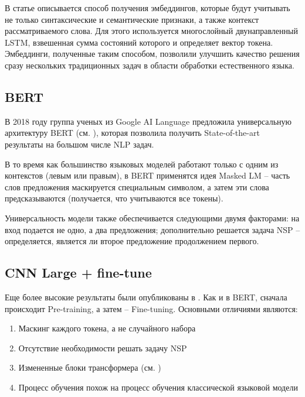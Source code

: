 \documentclass[a4paper,14pt]{extarticle}
\begin{document}
В статье \cite{1802.05365} описывается способ получения эмбеддингов, которые будут учитывать не только синтаксические и семантические признаки, а также контекст рассматриваемого слова. Для этого используется многослойный двунаправленный LSTM, взвешенная сумма состояний которого и определяет вектор токена. Эмбеддинги, полученные таким способом, позволили улучшить качество решения сразу нескольких традиционных задач в области обработки естественного языка.


\subsection{BERT}

В 2018 году группа ученых из Google AI Language предложила универсальную архитектуру BERT (см. \cite{1810.04805}), которая позволила получить State-of-the-art результаты на большом числе NLP задач.

В то время как большинство языковых моделей работают только с одним из контекстов (левым или правым), в BERT применятся идея Masked LM -- часть слов предложения маскируется специальным символом, а затем эти слова предсказываются (получается, что учитываются все токены).


Универсальность модели также обеспечивается следующими двумя факторами: на вход подается не одно, а два предложения; дополнительно решается задача NSP -- определяется, является ли второе предложение продолжением первого.


\clearpage

\subsection{CNN Large + fine-tune}

Еще более высокие результаты были опубликованы в \cite{1903.07785}. Как и в BERT, сначала происходит Pre-training, а затем -- Fine-tuning. Основными отличиями являются:
\begin{enumerate}
    \item Маскинг каждого токена, а не случайного набора
    \item Отсутствие необходимости решать задачу NSP
    \item Измененные блоки трансформера (см. \cite{1706.03762})
    \item Процесс обучения похож на процесс обучения классической языковой модели
\end{enumerate}
\end{document}
